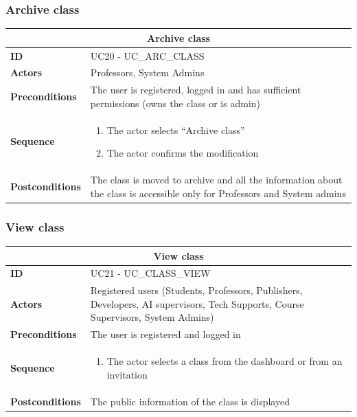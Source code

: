 \subsubsection{Archive class}
\begin{tabular}{|m{2.5cm}|m{8cm}|}
	\hline
	\multicolumn{2}{|c|}{Archive class} \\
	\hline
	\textbf{ID} & UC20 - UC\_ARC\_CLASS \\
	\hline
	\textbf{Actors} & Professors, System Admins \\
	\hline
	\textbf{Preconditions} & The user is registered, logged in and has sufficient permissions (owns the class or is admin) \\
	\hline
	\textbf{Sequence} & 
	\begin{enumerate}
		\item The actor selects “Archive class”
		\item The actor confirms the modification
	\end{enumerate} \\
	\hline
	\textbf{Postconditions} & The class is moved to archive and all the information about the class is accessible only for Professors and System admins \\
	\hline
\end{tabular}

\subsubsection{View class}
\begin{tabular}{|m{2.5cm}|m{8cm}|}
	\hline
	\multicolumn{2}{|c|}{View class} \\
	\hline
	\textbf{ID} & UC21 - UC\_CLASS\_VIEW \\
	\hline
	\textbf{Actors} & Registered users (Students, Professors, Publishers, Developers, AI supervisors, Tech Supports, Course Supervisors, System Admins) \\
	\hline
	\textbf{Preconditions} & The user is registered and logged in \\
	\hline
	\textbf{Sequence} & 
	\begin{enumerate}
		\item The actor selects a class from the dashboard or from an invitation
	\end{enumerate} \\
	\hline
	\textbf{Postconditions} & The public information of the class is displayed \\
	\hline
\end{tabular}

